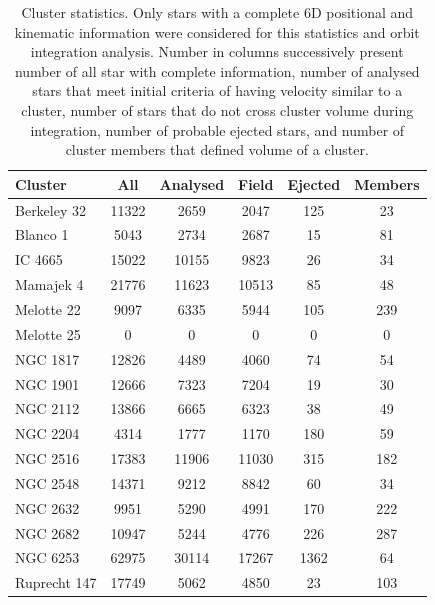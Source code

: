 \begin{table}
	\centering
	\caption{Cluster statistics. Only stars with a complete 6D positional and kinematic information were considered for this statistics and orbit integration analysis. Number in columns successively present number of all star with complete information, number of analysed stars that meet initial criteria of having velocity similar to a cluster, number of stars that do not cross cluster volume during integration, number of probable ejected stars, and number of cluster members that defined volume of a cluster.}
	\begin{tabular}{l | c | c | c | c | c }
		\hline
		Cluster & All & Analysed & Field & Ejected & Members \\
		\hline
		Berkeley 32  & 11322 & 2659 & 2047 & 125 & 23 \\ 
		Blanco 1     & 5043 & 2734 & 2687 & 15 & 81 \\
		IC 4665      & 15022 & 10155 & 9823 & 26 & 34 \\
		Mamajek 4    & 21776 & 11623 & 10513 & 85 & 48 \\
		Melotte 22   & 9097 & 6335 & 5944 & 105 & 239 \\
		Melotte 25   & 0 & 0 & 0 & 0 & 0 \\
		NGC 1817     & 12826 & 4489 & 4060 & 74 & 54 \\
		NGC 1901     & 12666 & 7323 & 7204 & 19 & 30 \\
		NGC 2112     & 13866 & 6665 & 6323 & 38 & 49 \\
		NGC 2204     & 4314 & 1777 & 1170 & 180 & 59 \\
		NGC 2516     & 17383 & 11906 & 11030 & 315 & 182 \\
		NGC 2548     & 14371 & 9212 & 8842 & 60 & 34 \\
		NGC 2632     & 9951 & 5290 & 4991 & 170 & 222 \\
		NGC 2682     & 10947 & 5244 & 4776 & 226 & 287 \\
		NGC 6253     & 62975 & 30114 & 17267 & 1362 & 64 \\
		Ruprecht 147 & 17749 & 5062 & 4850 & 23 & 103 \\
		\hline
	\end{tabular}
	\label{tab:cluster_stats}
\end{table}


